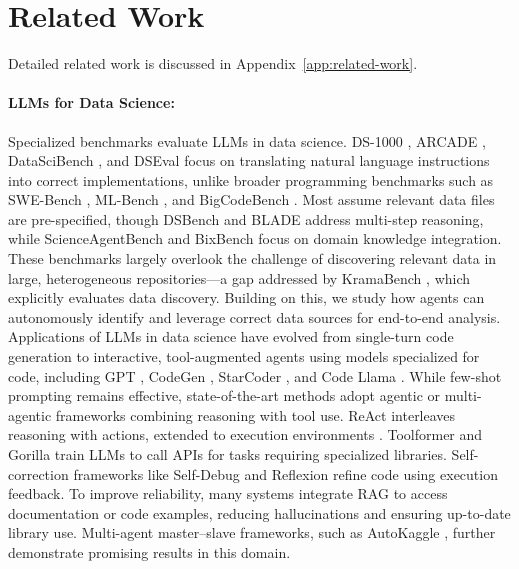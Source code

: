 \section{Related Work}

Detailed related work is discussed in Appendix~\ref{app:related-work}.


\paragraph{LLMs for Data Science:} Specialized benchmarks evaluate LLMs in data science. DS-1000 \citep{10.5555/3618408.3619164}, ARCADE \citep{yin-etal-2023-natural}, DataSciBench \citep{zhang2025datascibenchllmagentbenchmark}, and DSEval \citep{zhang-etal-2024-benchmarking-data} focus on translating natural language instructions into correct implementations, unlike broader programming benchmarks such as SWE-Bench \citep{jimenez2024swebench}, ML-Bench \citep{tang2025mlbench}, and BigCodeBench \citep{zhuo2025bigcodebench}. Most assume relevant data files are pre-specified, though DSBench \citep{jing2025dsbench} and BLADE \citep{gu-etal-2024-blade} address multi-step reasoning, while ScienceAgentBench \citep{chen2025scienceagentbench} and BixBench \citep{mitchener2025bixbenchcomprehensivebenchmarkllmbased} focus on domain knowledge integration. These benchmarks largely overlook the challenge of discovering relevant data in large, heterogeneous repositories—a gap addressed by KramaBench \citep{lai2025kramabenchbenchmarkaisystems}, which explicitly evaluates data discovery. Building on this, we study how agents can autonomously identify and leverage correct data sources for end-to-end analysis. Applications of LLMs in data science have evolved from single-turn code generation to interactive, tool-augmented agents using models specialized for code, including GPT \citep{10.5555/3495724.3495883}, CodeGen \citep{rubavicius2025conversationalcodegenerationcase}, StarCoder \citep{li2023starcoder}, and Code Llama \citep{codellama}. While few-shot prompting \citep{10.5555/3495724.3495883} remains effective, state-of-the-art methods adopt agentic or multi-agentic frameworks combining reasoning with tool use. ReAct \citep{yao2023react} interleaves reasoning with actions, extended to execution environments \citep{chen2018executionguided}. Toolformer \citep{schick2023toolformer} and Gorilla \citep{patil2024gorilla} train LLMs to call APIs for tasks requiring specialized libraries. Self-correction frameworks like Self-Debug \citep{chen2024teaching} and Reflexion \citep{shinn2023reflexion} refine code using execution feedback. To improve reliability, many systems integrate RAG \citep{10.5555/3495724.3496517, salemi2025planandrefinediversecomprehensiveretrievalaugmented, 10.1145/3731120.3744584, 10.1145/3626772.3657733} to access documentation or code examples, reducing hallucinations and ensuring up-to-date library use. Multi-agent master–slave frameworks, such as AutoKaggle \citep{li2025autokaggle}, further demonstrate promising results in this domain.


